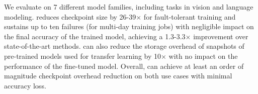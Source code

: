 We evaluate \sys on 7 different model families, including tasks in vision and language modeling.
\sys reduces checkpoint size by 26-39$\times$ for fault-tolerant training and sustains up to ten failures (for multi-day training jobs) with negligible impact on the final accuracy of the trained model, achieving a 1.3-3.3$\times$ improvement over state-of-the-art methods. \sys can also reduce the storage overhead of snapshots of pre-trained models used for transfer learning by 10$\times$ with no impact on the performance of the fine-tuned model. Overall, \sys can achieve at least an order of magnitude checkpoint overhead reduction on both use cases with minimal accuracy loss. 
